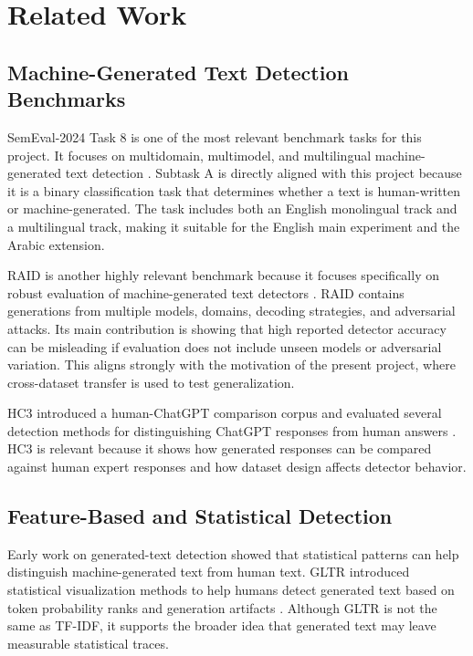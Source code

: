 \documentclass[conference]{IEEEtran}
\begin{document}
\section{Related Work}

\subsection{Machine-Generated Text Detection Benchmarks}
SemEval-2024 Task 8 is one of the most relevant benchmark tasks for this project. It focuses on multidomain, multimodel, and multilingual machine-generated text detection \cite{wang2024semeval}. Subtask A is directly aligned with this project because it is a binary classification task that determines whether a text is human-written or machine-generated. The task includes both an English monolingual track and a multilingual track, making it suitable for the English main experiment and the Arabic extension.

RAID is another highly relevant benchmark because it focuses specifically on robust evaluation of machine-generated text detectors \cite{dugan2024raid}. RAID contains generations from multiple models, domains, decoding strategies, and adversarial attacks. Its main contribution is showing that high reported detector accuracy can be misleading if evaluation does not include unseen models or adversarial variation. This aligns strongly with the motivation of the present project, where cross-dataset transfer is used to test generalization.

HC3 introduced a human-ChatGPT comparison corpus and evaluated several detection methods for distinguishing ChatGPT responses from human answers \cite{guo2023hc3}. HC3 is relevant because it shows how generated responses can be compared against human expert responses and how dataset design affects detector behavior.

\subsection{Feature-Based and Statistical Detection}
Early work on generated-text detection showed that statistical patterns can help distinguish machine-generated text from human text. GLTR introduced statistical visualization methods to help humans detect generated text based on token probability ranks and generation artifacts \cite{gehrmann2019gltr}. Although GLTR is not the same as TF-IDF, it supports the broader idea that generated text may leave measurable statistical traces.
\end{document}

